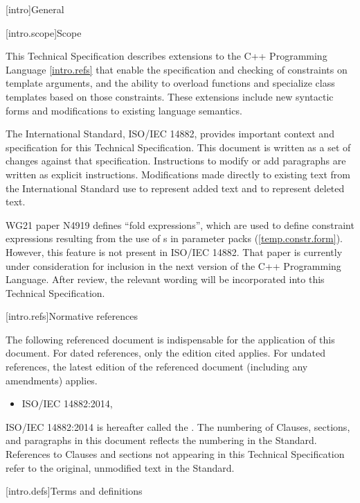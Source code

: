 
[intro]{General}

[intro.scope]{Scope}

\pnum
This Technical Specification describes extensions to the C++ 
Programming Language \ref{intro.refs} that
enable the specification and checking of constraints on template 
arguments, and the ability to overload functions and specialize
class templates based on those constraints. These extensions include 
new syntactic forms and modifications to existing language semantics.

\pnum
The International Standard, ISO/IEC 14882, provides important context
and specification for this Technical Specification. This document is 
written as a set of changes against that specification. Instructions
to modify or add paragraphs are written as explicit instructions. 
Modifications made directly to existing text from the International
Standard use  to represent added text and
 to represent deleted text.

\pnum
WG21 paper N4919 defines ``fold expressions'', which are used to define 
constraint expressions resulting from the use of 
s in parameter packs 
(\ref{temp.constr.form}). However, this feature is not present in ISO/IEC 14882. 
% 
That paper is currently under consideration for inclusion in the next version
of the C++ Programming Language. After review, the relevant wording will
be incorporated into this Technical Specification.


[intro.refs]{Normative references}

\pnum
The following referenced document is indispensable for the
application of this document. For dated references, only the
edition cited applies. For undated references, the latest edition
of the referenced document (including any amendments) applies.

\begin{itemize}
\item ISO/IEC 14882:2014, 
\end{itemize}

ISO/IEC 14882:2014 is hereafter called the .
%
The numbering of Clauses, sections, and paragraphs in this document
reflects the numbering in the \Cpp Standard. References to Clauses
and sections not appearing in this Technical Specification refer to
the original, unmodified text in the \Cpp Standard.

[intro.defs]{Terms and definitions}

